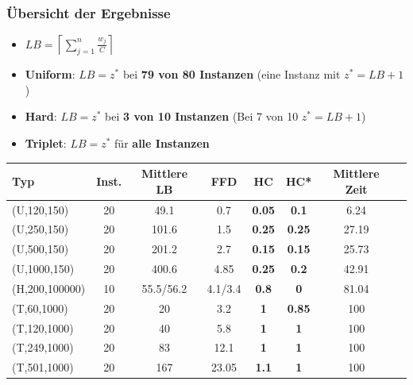 \documentclass{beamer}
\begin{document}
\begin{frame}
\frametitle{Übersicht der Ergebnisse}
\begin{footnotesize}
\begin{itemize}
\item $LB = \left\lceil\sum_{j=1}^{n} \frac{w_j}{C}\right\rceil$
\item \textbf{Uniform}: $LB = z^{*}$ bei \textbf{79 von 80 Instanzen} (eine Instanz mit $z^{*} = LB + 1$)
\item \textbf{Hard}: $LB = z^{*}$ bei \textbf{3 von 10 Instanzen} (Bei 7 von 10 $z^{*} = LB + 1$) 
\item \textbf{Triplet}: $LB = z^{*}$ für \textbf{alle Instanzen} 
\end{itemize}
\end{footnotesize}

\begin{scriptsize}
\begin{table}
\begin{tabular}{l c c c c c c c}
\toprule
\textbf{Typ} & \textbf{Inst.} &  \textbf{Mittlere LB} & \textbf{FFD} & \textbf{HC} & \textbf{HC*}  & \textbf{Mittlere Zeit}\\
\midrule
(U,120,150)  & 20    & 49.1  & 0.7 & \textbf{0.05} & \textbf{0.1} & 6.24 \\
(U,250,150)  & 20     & 101.6  & 1.5 & \textbf{0.25} & \textbf{0.25} & 27.19 \\
(U,500,150)  & 20     & 201.2  & 2.7 & \textbf{0.15} & \textbf{0.15} &  25.73\\
(U,1000,150)  & 20     & 400.6  & 4.85 & \textbf{0.25} & \textbf{0.2} & 42.91\\ \midrule
(H,200,100000)  & 10     & 55.5/56.2  & 4.1/3.4 & \textbf{0.8} &\textbf{0} & 81.04 \\\midrule
(T,60,1000)  & 20      & 20  & 3.2 & \textbf{1} &\textbf{0.85} & 100 \\
(T,120,1000)  & 20     & 40  & 5.8 & \textbf{1} &\textbf{1} & 100 \\
(T,249,1000)  & 20     & 83  & 12.1 & \textbf{1} &\textbf{1} & 100 \\
(T,501,1000)  & 20     & 167  & 23.05 & \textbf{1.1} &\textbf{1} & 100 \\
\bottomrule
\end{tabular}
\end{table}
\end{scriptsize}

\end{frame}
\end{document}
